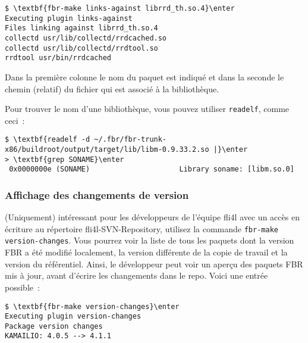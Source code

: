 \begin{example}
\begin{Verbatim}[commandchars=\\\{\}]
$ \textbf{fbr-make links-against librrd_th.so.4}\enter
Executing plugin links-against
Files linking against librrd_th.so.4
collectd usr/lib/collectd/rrdcached.so
collectd usr/lib/collectd/rrdtool.so
rrdtool usr/bin/rrdcached
\end{Verbatim}
\end{example}

Dans la première colonne le nom du paquet est indiqué et dans la seconde le chemin
(relatif) du fichier qui est associé à la bibliothèque.

Pour trouver le nom d'une bibliothèque, vous pouvez utiliser
\texttt{readelf}, comme ceci~:

\begin{example}
\begin{Verbatim}[commandchars=\\\{\}]
$ \textbf{readelf -d ~/.fbr/fbr-trunk-x86/buildroot/output/target/lib/libm-0.9.33.2.so |}\enter
> \textbf{grep SONAME}\enter
 0x0000000e (SONAME)                     Library soname: [libm.so.0]
\end{Verbatim}
\end{example}

\subsubsection{Affichage des changements de version}

(Uniquement) intéressant pour les développeurs de l'équipe fli4l avec un accès
en écriture au répertoire fli4l-SVN-Repository, utilisez la commande
\texttt{fbr-make version-changes}. Vous pourrez voir la liste de tous les paquets
dont la version FBR a été modifié localement, la version différente de la copie
de travail et la version du référentiel. Ainsi, le développeur peut voir un
aperçu des paquets FBR mis à jour, avant d'écrire les changements dans le repo.
Voici une entrée possible~:

\begin{example}
\begin{Verbatim}[commandchars=\\\{\}]
$ \textbf{fbr-make version-changes}\enter
Executing plugin version-changes
Package version changes
KAMAILIO: 4.0.5 --> 4.1.1
\end{Verbatim}
\end{example}

